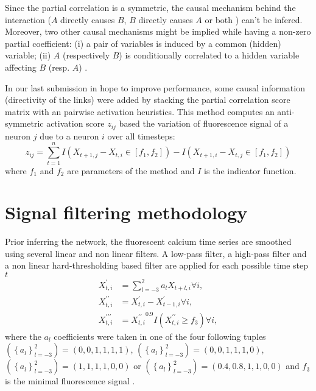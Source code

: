\documentclass[wcp]{jmlr}
\begin{document}
Since the partial correlation is a symmetric, the causal mechanism behind the
interaction ($A$ directly causes $B$, $B$ directly causes $A$ or both ) can't
be infered. Moreover, two other causal mechanisms might be implied while having
a non-zero partial coefficient: (i) a pair of variables is induced by a
common (hidden) variable; (ii) $A$ (respectively $B$) is conditionally
correlated to a hidden variable affecting $B$ (resp. $A$)
\cite{de2004discovery}.

In our last submission in hope to improve performance, some causal information
(directivity of the links) were added by stacking the partial correlation score
matrix with an pairwise activation heuristics. This method computes an anti-symmetric
activation score $z_{ij}$ based the variation of fluorescence signal of a neuron
$j$ due to a neuron $i$ over all timesteps:
\[
z_{ij} = \sum_{t=1}^n I(X_{t+1,j} - X_{t, i} \in [f_1, f_2]) -  I(X_{t+1,i} - X_{t, j} \in [f_1, f_2])
\]
where $f_1$ and $f_2$ are parameters of the method and $I$ is the
indicator function.

\section{Signal filtering methodology}


Prior inferring the network, the fluorescent calcium time series are smoothed
using several linear and non linear filters. A low-pass filter, a high-pass
filter and a non linear hard-thresholding based filter are
applied for each possible time step $t$
\begin{align}
X^\prime_{t,i} &= \sum_{l=-3}^2 a_l X_{t+l,i} \forall i, \\
X^{\prime\prime}_{t,i} &= X^{\prime}_{t,i} - X^{\prime}_{t-1,i} \forall i, \\
X^{\prime\prime\prime}_{t,i} &= {X^{\prime\prime}_{t,i}}^{0.9} I(X^{\prime\prime}_{t,i} \geq f_3) \forall i,
\end{align}
where the $a_l$ coefficients were taken in one of the four following tuples
$(\left\{a_l\right\}_{l=-3}^2)=(0, 0, 1, 1, 1, 1)$,
$(\left\{a_l\right\}_{l=-3}^2)=(0, 0, 1, 1, 1, 0)$,
$(\left\{a_l\right\}_{l=-3}^2)=(1, 1, 1, 1, 0, 0)$ or
$(\left\{a_l\right\}_{l=-3}^2)=(0.4, 0.8, 1, 1, 0, 0)$ and $f_3$ is the minimal
fluorescence signal .
\end{document}
